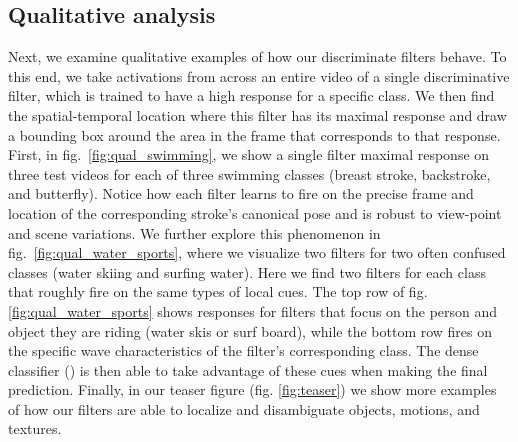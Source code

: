 \documentclass[10pt,twocolumn,letterpaper]{article}
\begin{document}
\subsection{Qualitative analysis}
\label{sec:exp:qualitative}
\vspace{-2mm}
Next, we examine qualitative examples of how our discriminate filters behave. To this end, we take activations from across an entire video of a single discriminative filter, which is trained to have a high response for a specific class. We then find the spatial-temporal location where this filter has its maximal response and draw a bounding box around the area in the frame that corresponds to that response. First, in fig.~\ref{fig:qual_swimming}, we show a single filter maximal response on three test videos for each of three swimming classes (breast stroke, backstroke, and butterfly). Notice how each filter learns to fire on the precise frame and location of the corresponding stroke's canonical pose and is robust to view-point and scene variations. We further explore this phenomenon in fig.~\ref{fig:qual_water_sports}, where we visualize two filters for two often confused classes (water skiing and surfing water). Here we find two filters for each class that roughly fire on the same types of local cues. The top row of fig. \ref{fig:qual_water_sports} shows responses for filters that focus on the person and object they are riding (water skis or surf board), while the bottom row fires on the specific wave characteristics of the filter's corresponding class. The dense classifier () is then able to take advantage of these cues when making the final prediction. Finally, in our teaser figure (fig. \ref{fig:teaser}) we show more examples of how our filters are able to localize and disambiguate objects, motions, and textures.
\end{document}

